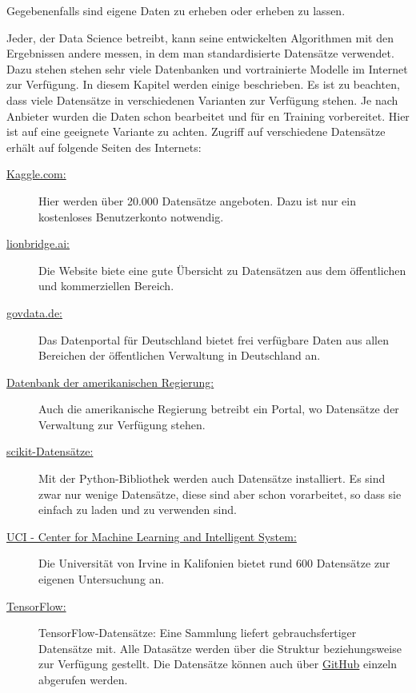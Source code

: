 {Gegebenenfalls sind eigene Daten zu erheben oder erheben zu lassen.

Jeder, der Data Science betreibt, kann seine entwickelten Algorithmen mit den Ergebnissen andere messen, in dem man standardisierte Datensätze verwendet. Dazu stehen stehen sehr viele Datenbanken und vortrainierte Modelle im Internet zur Verfügung. In diesem Kapitel werden einige beschrieben. Es ist zu beachten, dass viele Datensätze in verschiedenen Varianten zur Verfügung stehen. Je nach Anbieter wurden die Daten schon bearbeitet und für en Training vorbereitet. Hier ist auf eine geeignete Variante zu achten. Zugriff auf verschiedene Datensätze erhält auf folgende Seiten des Internets:


\begin{description}
  \item [\href{https://www.kaggle.com/datasets}{Kaggle.com:}] Hier werden über 20.000 Datensätze angeboten. Dazu ist nur ein kostenloses Benutzerkonto notwendig.
  
  \item [\href{https://lionbridge.ai/datasets/the-50-best-free-datasets-for-machine-learning/}{lionbridge.ai:}]  Die Website biete eine gute Übersicht zu Datensätzen aus dem öffentlichen und kommerziellen Bereich.
  
  \item [\href{govdata.de}{govdata.de:}] Das Datenportal für Deutschland bietet frei verfügbare Daten aus allen Bereichen der öffentlichen Verwaltung in Deutschland an.

  \item [\href{https://www.data.gov}{Datenbank der amerikanischen Regierung:}] Auch die amerikanische Regierung betreibt ein Portal, wo Datensätze der Verwaltung zur Verfügung stehen.
  
  \item [\href{https://riptutorial.com/de/scikit-learn/example/6801/beispieldatensatze}{scikit-Datensätze:}] Mit der Python-Bibliothek werden auch Datensätze installiert. Es sind zwar nur wenige Datensätze, diese sind aber schon vorarbeitet, so dass sie einfach zu laden und zu verwenden sind.

  \item [\href{https://archive.ics.uci.edu/ml/datasets.php}{UCI - Center for Machine Learning and Intelligent System:}] Die Universität von Irvine in  Kalifonien bietet rund 600 Datensätze zur eigenen Untersuchung an.
  
  \item [\href{}{TensorFlow:}] TensorFlow-Datensätze: Eine Sammlung liefert gebrauchsfertiger Datensätze mit. Alle Datasätze werden über die Struktur  beziehungsweise   zur Verfügung gestellt. Die Datensätze können auch über \href{https://github.com/tensorflow/datasets/tree/master/tensorflow_datasets}{GitHub} einzeln abgerufen werden. 


\end{description}}
